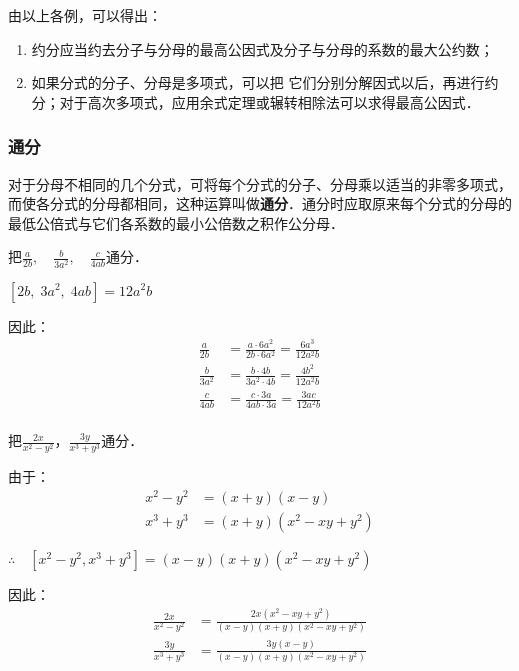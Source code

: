由以上各例，可以得出：
\begin{enumerate}
    \item 约分应当约去分子与分母的最高公因式及分子与分母的系数的最大公约数；
    \item 如果分式的分子、分母是多项式，可以把
它们分别分解因式以后，再进行约分；对于高次多项式，应用余式定理或辗转相除法可以求得最高公因式．
\end{enumerate} 

\subsubsection{通分}

对于分母不相同的几个分式，可将每个分式的分子、分母乘以适当的非零多项式，而使各分式的分母都相同，这种运算叫做\textbf{通分}．通分时应取原来每个分式的分母的最低公倍式与它们各系数的最小公倍数之积作公分母．

\begin{example}
    把$\frac{a}{2b},\quad \frac{b}{3a^2},\quad \frac{c}{4ab}$通分．
\end{example}

\begin{solution}
$[2b,\; 3a^2,\; 4ab]=12a^2b$

因此：
\[\begin{split}
    \frac{a}{2b}&=\frac{a\cdot 6a^2}{2b\cdot 6a^2}=\frac{6a^3}{12a^2b}\\
    \frac{b}{3a^2}&=\frac{b\cdot 4b}{3a^2\cdot 4b}=\frac{4b^2}{12a^2b}\\
     \frac{c}{4ab}&=\frac{c\cdot 3a}{4ab\cdot 3a}=\frac{3ac}{12a^2b}\\
\end{split}\]
\end{solution}

\begin{example}
    把$\frac{2x}{x^2-y^2}$，$\frac{3y}{x^3+y^3}$通分．
\end{example}

\begin{solution}
    由于：
    \[\begin{split}
        x^2-y^2&=(x+y)(x-y)\\
        x^3+y^3&=(x+y)(x^2-xy+y^2)
    \end{split}\]

$\therefore\quad [x^2-y^2, x^3+y^3]=(x-y)(x+y)(x^2-xy+y^2)$    

因此：
\[\begin{split}
    \frac{2x}{x^2-y^2}&=\frac{2x(x^2-xy+y^2)}{(x-y)(x+y)(x^2-xy+y^2)}\\
    \frac{3y}{x^3+y^3}&=\frac{3y(x-y)}{(x-y)(x+y)(x^2-xy+y^2)}
\end{split}\]
\end{solution}


